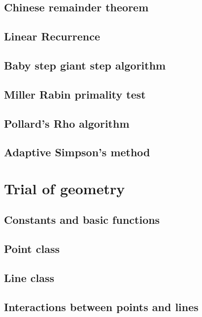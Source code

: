 \documentclass[UTF8,a4paper]{report}
\begin{document}
		\section{Chinese remainder theorem}
			
		\section{Linear Recurrence}
			
		\section{Baby step giant step algorithm}
			
		\section{Miller Rabin primality test}
			
		\section{Pollard's Rho algorithm}
			
		\section{Adaptive Simpson's method}
			
	\chapter{Trial of geometry}
		\section{Constants and basic functions}
			
		\section{Point class}
			
		\section{Line class}
			
		\section{Interactions between points and lines}
			
\end{document}
